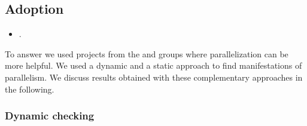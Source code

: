 \subsection{Adoption}
\label{sec:rqC}
\label{sec:rqE}

\begin{itemize}
    \item \numRQAdoptionOne. \textbf{\RQAdoptionOne{}}
\end{itemize}

To answer \numRQAdoptionOne{} we used projects from the \medg{} and
\longg{} groups where parallelization can be more helpful. We used a
dynamic and a static approach to find manifestations of
parallelism. We discuss results obtained with these complementary
approaches in the following.

\subsubsection{Dynamic checking}
\label{sec:rqC-1}

